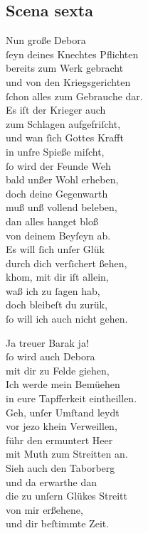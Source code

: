 \documentclass{ees}
\newenvironment{lyrics}[1]{%
  \subsection{#1}\nopagebreak%
  \begin{lyricslist}%
  \let\voice\item%
}{%
  \end{lyricslist}%
}
\begin{document}
\begin{lyrics}{Scena sexta}
  \voice[Barak]
  Nun große Debora\\
  ſeyn deines Knechtes Pflichten\\
  bereits zum Werk gebracht\\
  und von den Kriegsgerichten\\
  ſchon alles zum Gebrauche dar.\\
  Es iſt der Krieger auch\\
  zum Schlagen aufgefriſcht,\\
  und wan ſich Gottes Krafft\\
  in unſre Spieße miſcht,\\
  ſo wird der Feunde Weh\\
  bald unßer Wohl erheben,\\
  doch deine Gegenwarth\\
  muß unß vollend beleben,\\
  dan alles hanget bloß\\
  von deinem Beyſeyn ab.\\
  Es will ſich unſer Glük\\
  durch dich verſichert ßehen,\\
  khom, mit dir iſt allein,\\
  waß ich zu ſagen hab,\\
  doch bleibeſt du zurük,\\
  ſo will ich auch nicht gehen.

  \voice[Debora]
  Ja treuer Barak ja!\\
  ſo wird auch Debora\\
  mit dir zu Felde giehen,\\
  Ich werde mein Bemüehen\\
  in eure Tapfferkeit eintheillen.\\
  Geh, unſer Umſtand leydt\\
  vor jezo khein Verweillen,\\
  führ den ermuntert Heer\\
  mit Muth zum Streitten an.\\
  Sieh auch den Taborberg\\
  und da erwarthe dan\\
  die zu unſern Glükes Streitt\\
  von mir erßehene,\\
  und dir beſtimmte Zeit.


\end{lyrics}
\end{document}
